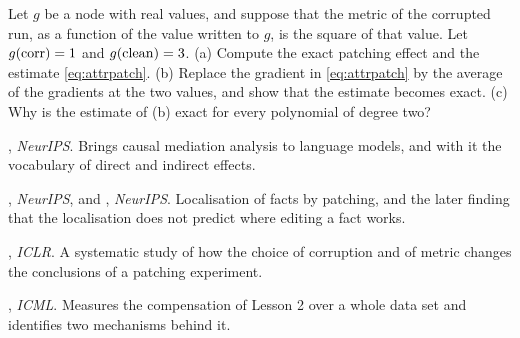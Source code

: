 \begin{exercise}\label{ex:trapezoid}
Let $g$ be a node with real values, and suppose that the metric of the corrupted run, as a function of the value
written to $g$, is the square of that value. Let $g(\mathrm{corr})=1$ and $g(\mathrm{clean})=3$. (a) Compute the exact patching
effect and the estimate \eqref{eq:attrpatch}. (b) Replace the gradient in \eqref{eq:attrpatch} by the average of
the gradients at the two values, and show that the estimate becomes exact. (c) Why is the estimate of (b) exact
for every polynomial of degree two?
\end{exercise}

\begin{readinglist}
\item \citet{vig2020investigating}, \emph{NeurIPS}. Brings causal mediation analysis to language models, and with
it the vocabulary of direct and indirect effects.
\item \citet{meng2022locating}, \emph{NeurIPS}, and \citet{hase2023does}, \emph{NeurIPS}. Localisation of facts by
patching, and the later finding that the localisation does not predict where editing a fact works.
\item \citet{zhang2024towards}, \emph{ICLR}. A systematic study of how the choice of corruption and of metric
changes the conclusions of a patching experiment.
\item \citet{rushing2024explorations}, \emph{ICML}. Measures the compensation of Lesson 2 over a whole data set
and identifies two mechanisms behind it.
\end{readinglist}
